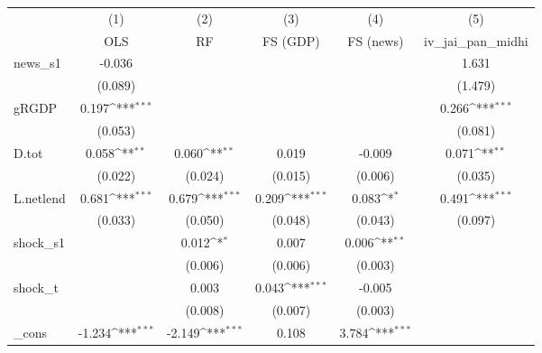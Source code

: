 {
\def\sym#1{\ifmmode^{#1}\else\(^{#1}\)\fi}
\begin{tabular}{l*{5}{c}}
\toprule
            &\multicolumn{1}{c}{(1)}&\multicolumn{1}{c}{(2)}&\multicolumn{1}{c}{(3)}&\multicolumn{1}{c}{(4)}&\multicolumn{1}{c}{(5)}\\
            &\multicolumn{1}{c}{OLS}&\multicolumn{1}{c}{RF}&\multicolumn{1}{c}{FS (GDP)}&\multicolumn{1}{c}{FS (news)}&\multicolumn{1}{c}{iv\_jai\_pan\_midhi}\\
\midrule
news\_s1     &      -0.036         &                     &                     &                     &       1.631         \\
            &     (0.089)         &                     &                     &                     &     (1.479)         \\
\addlinespace
gRGDP       &       0.197\sym{***}&                     &                     &                     &       0.266\sym{***}\\
            &     (0.053)         &                     &                     &                     &     (0.081)         \\
\addlinespace
D.tot       &       0.058\sym{**} &       0.060\sym{**} &       0.019         &      -0.009         &       0.071\sym{**} \\
            &     (0.022)         &     (0.024)         &     (0.015)         &     (0.006)         &     (0.035)         \\
\addlinespace
L.netlend   &       0.681\sym{***}&       0.679\sym{***}&       0.209\sym{***}&       0.083\sym{*}  &       0.491\sym{***}\\
            &     (0.033)         &     (0.050)         &     (0.048)         &     (0.043)         &     (0.097)         \\
\addlinespace
shock\_s1    &                     &       0.012\sym{*}  &       0.007         &       0.006\sym{**} &                     \\
            &                     &     (0.006)         &     (0.006)         &     (0.003)         &                     \\
\addlinespace
shock\_t     &                     &       0.003         &       0.043\sym{***}&      -0.005         &                     \\
            &                     &     (0.008)         &     (0.007)         &     (0.003)         &                     \\
\addlinespace
\_cons      &      -1.234\sym{***}&      -2.149\sym{***}&       0.108         &       3.784\sym{***}&                     \\

\end{tabular}}
